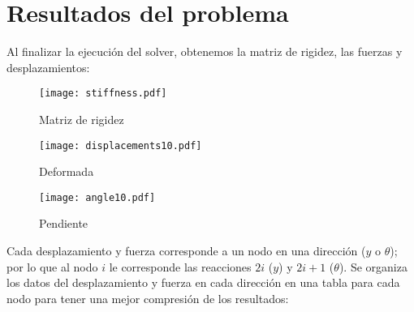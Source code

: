 \documentclass[11pt,a4paper]{article}
\begin{document}
\section{Resultados del problema}
Al finalizar la ejecución del solver, obtenemos la matriz de rigidez, las fuerzas y desplazamientos:
\begin{figure}[H]
    \centering
    \texttt{[image: stiffness.pdf]}
    \caption{Matriz de rigidez}
\end{figure}
\begin{figure}[H]
    \centering
    \texttt{[image: displacements10.pdf]}
    \caption{Deformada}
\end{figure}
\begin{figure}[H]
    \centering
    \texttt{[image: angle10.pdf]}
    \caption{Pendiente}
\end{figure}
Cada desplazamiento y fuerza corresponde a un nodo en una dirección ($y$ o $\theta$); por lo que al nodo $i$ le corresponde las reacciones $2i$ ($y$) y $2i+1$ ($\theta$).
Se organiza los datos del desplazamiento y fuerza en cada dirección en una tabla para cada nodo para tener una mejor compresión de los resultados:
\end{document}
